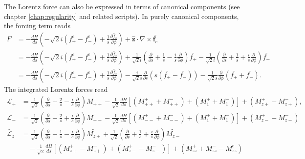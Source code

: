 The Lorentz force can also be expressed in terms of canonical components (see chapter \ref{chap:regularity} and related scripts). In purely canonical components, the forcing term reads
%
\begin{equation}\label{eqn:Fext-canonical}
    \begin{aligned}
        F &= -\frac{dH}{ds} \left(-\sqrt{2}i \left(f_+^e - f_-^e\right) + \frac{1}{s} \frac{\partial \widetilde{f_z}}{\partial \phi}\right) + \hat{\mathbf{z}}\cdot \nabla\times \overline{\mathbf{f}_e} \\
        &= -\frac{dH}{ds} \left(-\sqrt{2}i(f_+^e - f_-^e) + \frac{1}{s} \frac{\partial \widetilde{f_z}}{\partial \phi}\right) + \frac{1}{\sqrt{2}i}\left(\frac{\partial}{\partial s} + \frac{1}{s}- \frac{i}{s}\frac{\partial}{\partial \phi}\right) \overline{f_+} - \frac{1}{\sqrt{2}i}\left(\frac{\partial}{\partial s} + \frac{1}{s} + \frac{i}{s}\frac{\partial}{\partial \phi}\right) \overline{f_-} \\
        &= -\frac{dH}{ds} \left(-\sqrt{2}i \left(f_+^e - f_-^e\right) + \frac{1}{s} \frac{\partial \widetilde{f_z}}{\partial \phi}\right) - \frac{i}{\sqrt{2}s} \frac{\partial}{\partial s} \left(s \left(\overline{f_+} - \overline{f_-}\right)\right) - \frac{1}{\sqrt{2}s}\frac{\partial}{\partial \phi} \left(\overline{f_+} + \overline{f_-}\right).
    \end{aligned}
\end{equation}
%
The integrated Lorentz forces read
%
\begin{equation}\label{eqn:lorentz-int-canonical}
\begin{aligned}
    \overline{\mathcal{L}_+} &= \frac{1}{\sqrt{2}} \left(\frac{\partial}{\partial s} + \frac{2}{s} - \frac{i}{s} \frac{\partial}{\partial \phi}\right) \overline{M_{++}} - \frac{1}{\sqrt{2}} \frac{dH}{ds} \left[\left(M_{++}^+ + M_{++}^-\right) + \left(M_{1}^+ + M_{1}^-\right)\right] + \left(M_{z+}^+ - M_{z+}^-\right), \\
    \overline{\mathcal{L}_-} &= \frac{1}{\sqrt{2}} \left(\frac{\partial}{\partial s} + \frac{2}{s} + \frac{i}{s} \frac{\partial}{\partial \phi}\right) \overline{M_{--}} - \frac{1}{\sqrt{2}} \frac{dH}{ds} \left[\left(M_{--}^+ + M_{--}^-\right) + \left(M_{1}^+ + M_{1}^-\right)\right] + \left(M_{z-}^+ - M_{z-}^-\right) \\
    \widetilde{\mathcal{L}_z} &= \frac{1}{\sqrt{2}} \left(\frac{\partial}{\partial s} + \frac{1}{s} - \frac{i}{s} \frac{\partial}{\partial \phi}\right) \widetilde{M_{z+}} + \frac{1}{\sqrt{2}} \left(\frac{\partial}{\partial s} + \frac{1}{s} + \frac{i}{s} \frac{\partial}{\partial \phi}\right) \widetilde{M_{z-}} \\
    &\quad - \frac{1}{\sqrt{2}} \frac{dH}{ds} \left[\left(M_{z+}^+ - M_{z+}^-\right) + \left(M_{z-}^+ - M_{z-}^-\right)\right] + \left(M_{zz}^+ + M_{zz}^- - M_{zz}^e\right)
\end{aligned}
\end{equation}
